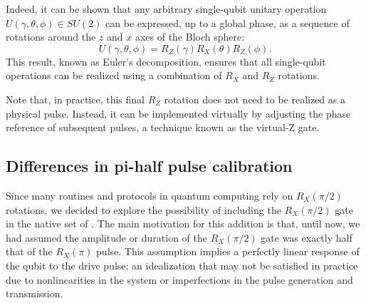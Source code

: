 Indeed, it can be shown that any arbitrary single-qubit unitary operation $ U(\gamma, \theta, \phi) \in SU(2) $ can be expressed, up to a global phase, as a sequence of rotations around the $z$ and $x$ axes of the Bloch sphere:
\begin{equation}
U(\gamma, \theta, \phi) = R_Z(\gamma) R_X(\theta) R_Z(\phi).
\end{equation}
This result, known as Euler's decomposition, ensures that all single-qubit operations can be realized using a combination of $ R_X $ and $ R_Z $ rotations. 

Note that, in practice, this final $R_Z$ rotation does not need to be realized as a physical pulse. 
Instead, it can be implemented virtually by adjusting the phase reference of subsequent pulses, a technique known as the virtual-Z gate\cite{McKay_2017}. \\

\subsection{Differences in pi-half pulse calibration}
Since many routines and protocols in quantum computing rely on $R_X(\pi/2)$ rotations, we decided to explore the possibility of including the $R_X(\pi/2)$ gate in the native set of \Qibolab.
The main motivation for this addition is that, until now, we had assumed the amplitude or duration of the $R_X(\pi/2)$ gate was exactly half that of the $R_X(\pi)$ pulse.
This assumption implies a perfectly linear response of the qubit to the drive pulse; an idealization that may not be satisfied in practice due to nonlinearities in the system or imperfections in the pulse generation and transmission.

